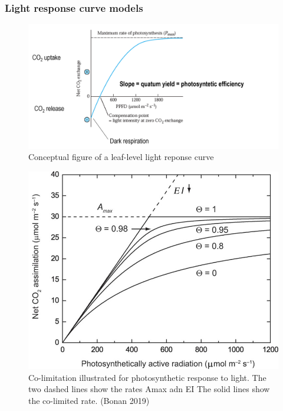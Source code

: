 \documentclass[
  oneside]{book}
\begin{document}
\hypertarget{light-response-curve-models}{%
\subsubsection{Light response curve models}\label{light-response-curve-models}}

\begin{figure}

{\centering \includegraphics[width=0.8\linewidth]{figures/chap2/LRC} 

}

\caption{Conceptual figure of a leaf-level light reponse curve}\label{fig:f24}
\end{figure}

\begin{figure}

{\centering \includegraphics[width=0.8\linewidth]{figures/chap2/hyperbola} 

}

\caption{Co-limitation illustrated for photosynthetic response to light. The two dashed lines show the rates Amax adn EI The solid lines show the co-limited rate. (Bonan 2019)}\label{fig:f25}
\end{figure}
\end{document}
